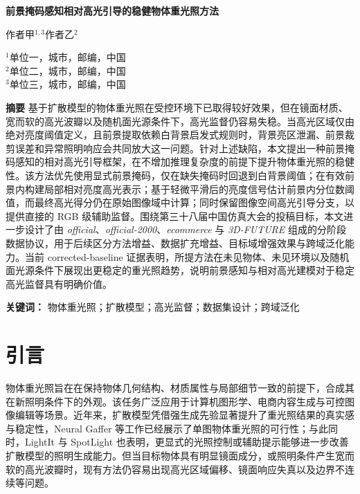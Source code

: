 \documentclass[UTF8,a4paper]{ctexart}
\newcommand{\papertitle}{前景掩码感知相对高光引导的稳健物体重光照方法}
\newcommand{\paperauthora}{作者甲$^{1,3}$}
\newcommand{\paperauthorb}{作者乙$^{2}$}
\newcommand{\affiliation}{
  $^{1}$单位一，城市，邮编，中国\\
  $^{2}$单位二，城市，邮编，中国\\
  $^{3}$单位三，城市，邮编，中国
}
\begin{document}
\begin{center}
{\bfseries{} \papertitle \par}
\vspace{1em}
{ \paperauthora \qquad \paperauthorb \par}
\vspace{0.75em}
{ \affiliation \par}
\end{center}

\vspace{1em}

\noindent\textbf{摘要}\quad
基于扩散模型的物体重光照在受控环境下已取得较好效果，但在镜面材质、宽而软的高光波瓣以及随机面光源条件下，高光监督仍容易失稳。当高光区域仅由绝对亮度阈值定义，且前景提取依赖白背景启发式规则时，背景亮区泄漏、前景裁剪误差和异常照明响应会共同放大这一问题。针对上述缺陷，本文提出一种前景掩码感知的相对高光引导框架，在不增加推理复杂度的前提下提升物体重光照的稳健性。该方法优先使用显式前景掩码，仅在缺失掩码时回退到白背景阈值；在有效前景内构建局部相对亮度高光表示；基于轻微平滑后的亮度信号估计前景内分位数阈值，而最终高光得分仍在原始图像域中计算；同时保留图像空间高光引导分支，以提供直接的 RGB 级辅助监督。围绕第三十八届中国仿真大会的投稿目标，本文进一步设计了由 \textit{official}、\textit{official-2000}、\textit{ecommerce} 与 \textit{3D-FUTURE} 组成的分阶段数据协议，用于后续区分方法增益、数据扩充增益、目标域增强效果与跨域泛化能力。当前 corrected-baseline 证据表明，所提方法在未见物体、未见环境以及随机面光源条件下展现出更稳定的重光照趋势，说明前景感知与相对高光建模对于稳定高光监督具有明确价值。

\vspace{0.5em}

\noindent\textbf{关键词：}\quad
物体重光照；扩散模型；高光监督；数据集设计；跨域泛化

\section{引言}

物体重光照旨在在保持物体几何结构、材质属性与局部细节一致的前提下，合成其在新照明条件下的外观。该任务广泛应用于计算机图形学、电商内容生成与可控图像编辑等场景。近年来，扩散模型凭借强生成先验显著提升了重光照结果的真实感与稳定性，Neural Gaffer 等工作已经展示了单图物体重光照的可行性\cite{ref_ng}；与此同时，LightIt 与 SpotLight 也表明，更显式的光照控制或辅助提示能够进一步改善扩散模型的照明生成能力\cite{ref_lightit,ref_spotlight}。但当目标物体具有明显镜面成分，或照明条件产生宽而软的高光波瓣时，现有方法仍容易出现高光区域偏移、镜面响应失真以及边界不连续等问题。
\end{document}
